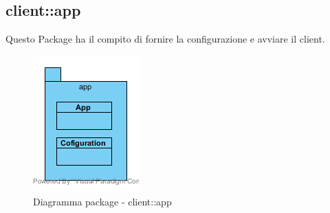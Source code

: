 \vspace{0.5cm}
\subsection{client::app}
Questo Package ha il compito di fornire la configurazione e avviare il client.\begin{center}
	\begin{figure}[H]
		\centering \includegraphics[scale=4, max width=\textwidth, max height=\myheight]{../img/diagrammiClassi/client/app.png}
		\caption{Diagramma package - client::app}
	\end{figure}
\end{center}\hypertarget{client::app::App}{}
